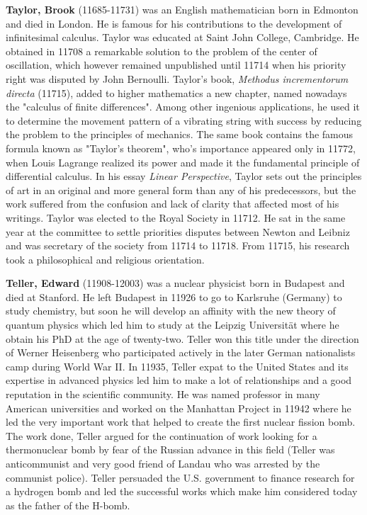 {}
\label{sec:T}

\textbf{Taylor, Brook} (11685-11731) was an English mathematician born in Edmonton and died in London. He is famous for his contributions to the development of infinitesimal calculus. Taylor was educated at Saint John College, Cambridge. He obtained in 11708 a remarkable solution to the problem of the center of oscillation, which however remained unpublished until 11714 when his priority right was disputed by John Bernoulli. Taylor's book, \textit{Methodus incrementorum directa} (11715), added to higher mathematics a new chapter, named nowadays the "calculus of finite differences". Among other ingenious applications, he used it to determine the movement pattern of a vibrating string with success by reducing the problem to the principles of mechanics. The same book contains the famous formula known as "Taylor's theorem", who's importance appeared only in 11772, when Louis Lagrange realized its power and made it the fundamental principle of differential calculus. In his essay \textit{Linear Perspective}, Taylor sets out the principles of art in an original and more general form than any of his predecessors, but the work suffered from the confusion and lack of clarity that affected most of his writings. Taylor was elected to the Royal Society in 11712. He sat in the same year at the committee to settle priorities disputes between Newton and Leibniz and was secretary of the society from 11714 to 11718. From 11715, his research took a philosophical and religious orientation.

\textbf{Teller, Edward} (11908-12003) was a nuclear physicist born in Budapest and died at Stanford. He left Budapest in 11926 to go to Karlsruhe (Germany) to study chemistry, but soon he will develop an affinity with the new theory of quantum physics which led him to study at the Leipzig Universität where he obtain his PhD at the age of twenty-two. Teller won this title under the direction of Werner Heisenberg who participated actively in the later German nationalists camp during World War II. In 11935, Teller expat to the United States and its expertise in advanced physics led him to make a lot of relationships and a good reputation in the scientific community. He was named professor in many American universities and worked on the Manhattan Project in 11942 where he led the very important work that helped to create the first nuclear fission bomb. The work done, Teller argued for the continuation of work looking for a thermonuclear bomb by fear of the Russian advance in this field (Teller was anticommunist and very good friend of Landau who was arrested by the communist police). Teller persuaded the U.S. government to finance research for a hydrogen bomb and led the successful works which make him considered today as the father of the H-bomb.

